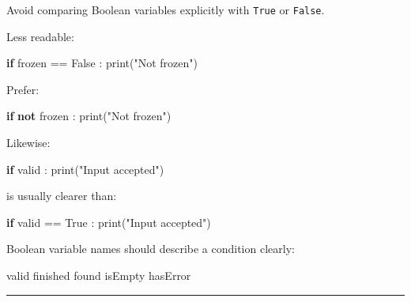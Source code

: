 \documentclass[
  11pt,
  a4paper,
]{article}
\newenvironment{Shaded}{}{}
\newcommand{\BuiltInTok}[1]{\textcolor[rgb]{0.00,0.50,0.00}{#1}}
\newcommand{\ControlFlowTok}[1]{\textcolor[rgb]{0.00,0.44,0.13}{\textbf{#1}}}
\newcommand{\KeywordTok}[1]{\textcolor[rgb]{0.00,0.44,0.13}{\textbf{#1}}}
\newcommand{\NormalTok}[1]{#1}
\newcommand{\OperatorTok}[1]{\textcolor[rgb]{0.40,0.40,0.40}{#1}}
\newcommand{\StringTok}[1]{\textcolor[rgb]{0.25,0.44,0.63}{#1}}
\newcommand{\VariableTok}[1]{\textcolor[rgb]{0.10,0.09,0.49}{#1}}
\begin{document}
Avoid comparing Boolean variables explicitly with \texttt{True} or
\texttt{False}.

Less readable:

\begin{Shaded}
\begin{Highlighting}[]
\ControlFlowTok{if}\NormalTok{ frozen }\OperatorTok{==} \VariableTok{False}\NormalTok{ :}
    \BuiltInTok{print}\NormalTok{(}\StringTok{"Not frozen"}\NormalTok{)}
\end{Highlighting}
\end{Shaded}

Prefer:

\begin{Shaded}
\begin{Highlighting}[]
\ControlFlowTok{if} \KeywordTok{not}\NormalTok{ frozen :}
    \BuiltInTok{print}\NormalTok{(}\StringTok{"Not frozen"}\NormalTok{)}
\end{Highlighting}
\end{Shaded}

Likewise:

\begin{Shaded}
\begin{Highlighting}[]
\ControlFlowTok{if}\NormalTok{ valid :}
    \BuiltInTok{print}\NormalTok{(}\StringTok{"Input accepted"}\NormalTok{)}
\end{Highlighting}
\end{Shaded}

is usually clearer than:

\begin{Shaded}
\begin{Highlighting}[]
\ControlFlowTok{if}\NormalTok{ valid }\OperatorTok{==} \VariableTok{True}\NormalTok{ :}
    \BuiltInTok{print}\NormalTok{(}\StringTok{"Input accepted"}\NormalTok{)}
\end{Highlighting}
\end{Shaded}

Boolean variable names should describe a condition clearly:

\begin{Shaded}
\begin{Highlighting}[]
\NormalTok{valid}
\NormalTok{finished}
\NormalTok{found}
\NormalTok{isEmpty}
\NormalTok{hasError}
\end{Highlighting}
\end{Shaded}

\begin{center}\rule{0.5\linewidth}{0.5pt}\end{center}
\end{document}
